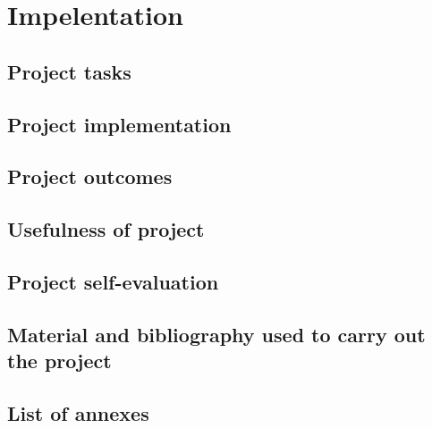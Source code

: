 \chapter{Impelentation}\label{ch:impelentation}


\section{Project tasks}\label{sec:project-tasks}



\section{Project implementation}\label{sec:project-implementation}



\section{Project outcomes}\label{sec:project-outcomes}



\section{Usefulness of project}\label{sec:usefulness-of-project}



\section{Project self-evaluation}\label{sec:project-self-evaluation}



\section{Material and bibliography used to carry out the project}\label{sec:material-and-bibliography-used-to-carry-out-the-project}



\section{List of annexes}\label{sec:list-of-annexes}


